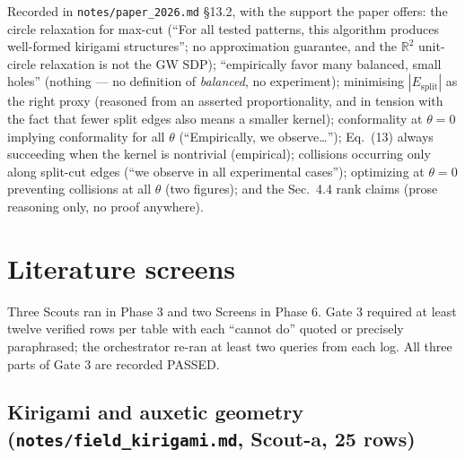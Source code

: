 \documentclass[10pt,a4paper]{article}
\newcommand{\fn}[1]{\nolinkurl{#1}}
\begin{document}
Recorded in \fn{notes/paper_2026.md} \S13.2, with the support the paper offers:
the circle relaxation for max-cut (``For all tested patterns, this algorithm produces
well-formed kirigami structures''; no approximation guarantee, and the $\mathbb R^2$ unit-circle
relaxation is not the GW SDP); ``empirically favor many balanced, small holes'' (nothing --- no
definition of \emph{balanced}, no experiment); minimising $|E_{\mathrm{split}}|$ as the right
proxy (reasoned from an asserted proportionality, and in tension with the fact that fewer split
edges also means a smaller kernel); conformality at $\theta=0$ implying conformality for all
$\theta$ (``Empirically, we observe\ldots''); Eq.~(13) always succeeding when the kernel is
nontrivial (empirical); collisions occurring only along split-cut edges (``we observe in all
experimental cases''); optimizing at $\theta=0$ preventing collisions at all $\theta$ (two
figures); and the Sec.~4.4 rank claims (prose reasoning only, no proof anywhere).

\section{Literature screens}

Three Scouts ran in Phase 3 and two Screens in Phase 6. Gate 3 required at least twelve
verified rows per table with each ``cannot do'' quoted or precisely paraphrased; the
orchestrator re-ran at least two queries from each log. All three parts of Gate 3 are recorded
PASSED.

\subsection{Kirigami and auxetic geometry (\texttt{notes/field\_kirigami.md}, Scout-a, 25 rows)}
\end{document}
